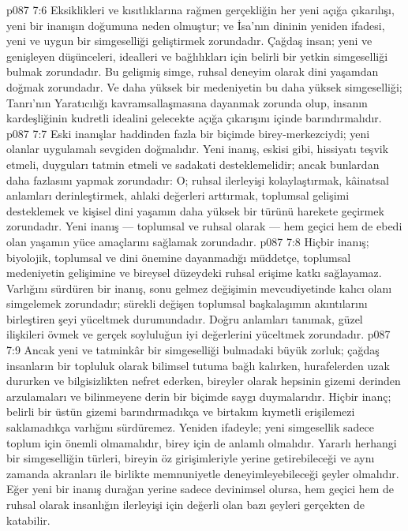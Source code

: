 \vs p087 7:6 Eksiklikleri ve kısıtlıklarına rağmen gerçekliğin her yeni açığa çıkarılışı, yeni bir inanışın doğumuna neden olmuştur; ve İsa’nın dininin yeniden ifadesi, yeni ve uygun bir simgeselliği geliştirmek zorundadır. Çağdaş insan; yeni ve genişleyen düşünceleri, idealleri ve bağlılıkları için belirli bir yetkin simgeselliği bulmak zorundadır. Bu gelişmiş simge, ruhsal deneyim olarak dini yaşamdan doğmak zorundadır. Ve daha yüksek bir medeniyetin bu daha yüksek simgeselliği; Tanrı’nın Yaratıcılığı kavramsallaşmasına dayanmak zorunda olup, insanın kardeşliğinin kudretli idealini gelecekte açığa çıkarışını içinde barındırmalıdır.
\vs p087 7:7 Eski inanışlar haddinden fazla bir biçimde birey\hyp{}merkezciydi; yeni olanlar uygulamalı sevgiden doğmalıdır. Yeni inanış, eskisi gibi, hissiyatı teşvik etmeli, duyguları tatmin etmeli ve sadakati desteklemelidir; ancak bunlardan daha fazlasını yapmak zorundadır: O; ruhsal ilerleyişi kolaylaştırmak, kâinatsal anlamları derinleştirmek, ahlaki değerleri arttırmak, toplumsal gelişimi desteklemek ve kişisel dini yaşamın daha yüksek bir türünü harekete geçirmek zorundadır. Yeni inanış --- toplumsal ve ruhsal olarak --- hem geçici hem de ebedi olan yaşamın yüce amaçlarını sağlamak zorundadır.
\vs p087 7:8 Hiçbir inanış;  biyolojik, toplumsal ve dini önemine dayanmadığı müddetçe, toplumsal medeniyetin gelişimine ve bireysel düzeydeki ruhsal erişime katkı sağlayamaz. Varlığını sürdüren bir inanış, sonu gelmez değişimin mevcudiyetinde kalıcı olanı simgelemek zorundadır; sürekli değişen toplumsal başkalaşımın akıntılarını birleştiren şeyi yüceltmek durumundadır. Doğru anlamları tanımak, güzel ilişkileri övmek ve gerçek soyluluğun iyi değerlerini yüceltmek zorundadır.
\vs p087 7:9 Ancak yeni ve tatminkâr bir simgeselliği bulmadaki büyük zorluk; çağdaş insanların bir topluluk olarak bilimsel tutuma bağlı kalırken, hurafelerden uzak dururken ve bilgisizlikten nefret ederken, bireyler olarak hepsinin gizemi derinden arzulamaları ve bilinmeyene derin bir biçimde saygı duymalarıdır. Hiçbir inanç; belirli bir üstün gizemi barındırmadıkça ve birtakım kıymetli erişilemezi saklamadıkça varlığını sürdüremez. Yeniden ifadeyle; yeni simgesellik sadece toplum için önemli olmamalıdır, birey için de anlamlı olmalıdır. Yararlı herhangi bir simgeselliğin türleri, bireyin öz girişimleriyle yerine getirebileceği ve aynı zamanda akranları ile birlikte memnuniyetle deneyimleyebileceği şeyler olmalıdır. Eğer yeni bir inanış durağan yerine sadece devinimsel olursa, hem geçici hem de ruhsal olarak insanlığın ilerleyişi için değerli olan bazı şeyleri gerçekten de katabilir.
